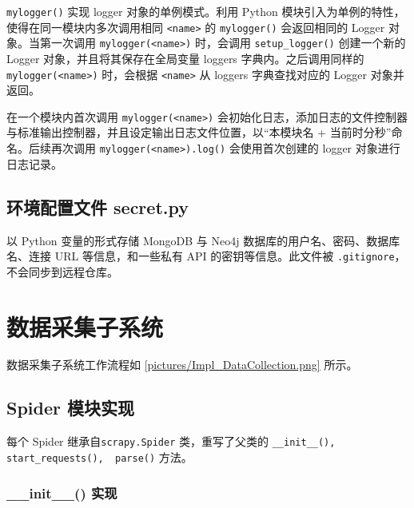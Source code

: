 \documentclass[a4paper,AutoFakeBold,oneside,12pt]{book}
\begin{document}
\lstinline[style = python]|mylogger()| 实现 logger 对象的单例模式\cite{singleton_design_pattern}。利用 Python 模块引入为单例的特性，使得在同一模块内多次调用相同 \lstinline[style = python]|<name>| 的 \lstinline[style = python]|mylogger()| 会返回相同的 Logger 对象。当第一次调用 \lstinline|mylogger(<name>)| 时，会调用 \lstinline|setup_logger()| 创建一个新的 Logger 对象，并且将其保存在全局变量 loggers 字典内。之后调用同样的 \lstinline|mylogger(<name>)| 时，会根据 \lstinline|<name>| 从 loggers 字典查找对应的 Logger 对象并返回。

在一个模块内首次调用 \lstinline[style = python]|mylogger(<name>)| 会初始化日志，添加日志的文件控制器与标准输出控制器，并且设定输出日志文件位置，以“本模块名 + 当前时分秒”命名。后续再次调用 \lstinline[style = python]|mylogger(<name>).log()| 会使用首次创建的 logger 对象进行日志记录。

\subsection{环境配置文件 secret.py}

以 Python 变量的形式存储 MongoDB 与 Neo4j 数据库的用户名、密码、数据库名、连接 URL 等信息，和一些私有 API 的密钥等信息。此文件被 \lstinline|.gitignore|，不会同步到远程仓库。

\section{数据采集子系统}

数据采集子系统工作流程如 \ref{pictures/Impl_DataCollection.png} 所示。


\subsection{Spider 模块实现}

每个 Spider 继承自\lstinline[style = python]|scrapy.Spider| 类，重写了父类的 \lstinline[style = python]|__init__(), start_requests(),  parse()| 方法。

\subsubsection{{\_\_}init{\_\_}() 实现}
\end{document}
